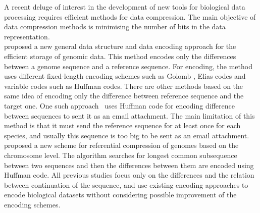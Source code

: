 \documentclass[twocolumn,12pt,a4paper]{article}
\begin{document}
A recent deluge of interest in the development of new tools for biological data processing requires efficient methods for data compression. The main objective of data compression methods is minimising the number of bits in the data representation.\\ 
\citet{bra09} proposed a new general data structure and data encoding approach for the efficient storage of genomic data. This method encodes only the differences between a genome sequence and a reference sequence. For encoding, the method uses different fixed-length encoding schemes such as Golomb \citep{Golomb96}, Elias codes \citep{Elias75} and variable codes such as Huffman codes. There are other methods based on the same idea of encoding only the difference between reference sequence and the target one. One such approach~\citep{chr09} uses Huffman code for encoding difference between sequences to sent it as an email attachment. The main limitation of this method is that it must send the reference sequence for at least once for each species, and usually this sequence is too big to be sent as an email attachment.
\citet{wan11} proposed a new scheme for referential compression of genomes based on the chromosome level. The algorithm searches for longest common subsequence between two sequences and then the differences between them are encoded using Huffman code.
All previous studies focus only on the differences and the relation between continuation of the sequence, and use existing encoding approaches to encode biological datasets without considering possible improvement of the encoding schemes.

\end{document}
